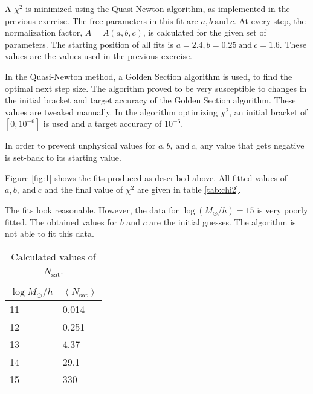 A $\chi^2$ is minimized using the Quasi-Newton algorithm, as implemented in the previous exercise. The free parameters in this fit are $a,b \ \mathrm{and}\ c$. At every step, the normalization factor, $A = A(a,b,c)$, is calculated for the given set of parameters. The starting position of all fits is $a=2.4, b=0.25 \ \mathrm{and}\ c=1.6$. These values are the values used in the previous exercise.

In the Quasi-Newton method, a Golden Section algorithm is used, to find the optimal next step size. The algorithm proved to be very susceptible to changes in the initial bracket and target accuracy of the Golden Section algorithm. These values are tweaked manually. In the algorithm optimizing $\chi^2$, an initial bracket of $[0, 10^{-6}]$ is used and a target accuracy of $10^{-6}$.

In order to prevent unphysical values for $a,b,\ \mathrm{and}\ c$, any value that gets negative is set-back to its starting value.

Figure \ref{fig:1} shows the fits produced as described above. All fitted values of $a,b,\ \mathrm{and}\ c$ and the final value of $\chi^2$ are given in table \ref{tab:chi2}.

The fits look reasonable. However, the data for $\log(M_\odot/h)=15$ is very poorly fitted. The obtained values for $b$ and $c$ are the initial guesses. The algorithm is not able to fit this data.


\begin{table}[h]
    \caption{Calculated values of $N_\mathrm{sat}$.}
    \label{tab:Nsat}
    \centering
    \begin{tabular}{l|l}
    $\log M_\odot/h$ & $\left\langle N_\mathrm{sat} \right\rangle$ \\ \hline
    11          & 0.014            \\
    12          & 0.251            \\
    13          & 4.37             \\
    14          & 29.1             \\
    15          & 330                                    
    \end{tabular}
\end{table}

